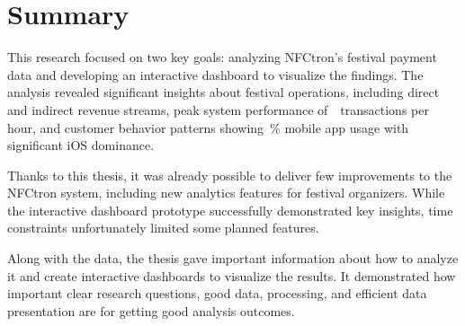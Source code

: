 \section*{Summary}
\label{sec:summary}
This research focused on two key goals: analyzing NFCtron's festival payment data and developing an interactive dashboard to visualize the findings.
The analysis revealed significant insights about festival operations, including direct and indirect revenue streams, peak system performance of~~transactions per hour,
and customer behavior patterns showing~\% mobile app usage with significant iOS dominance.

Thanks to this thesis, it was already possible to deliver few improvements to the NFCtron system, including new analytics features for festival organizers.
While the interactive dashboard prototype successfully demonstrated key insights, time constraints unfortunately limited some planned features.

Along with the data, the thesis gave important information about how to analyze it and create interactive dashboards to visualize the results.
It demonstrated how important clear research questions, good data, processing, and efficient data presentation are for getting good analysis outcomes.